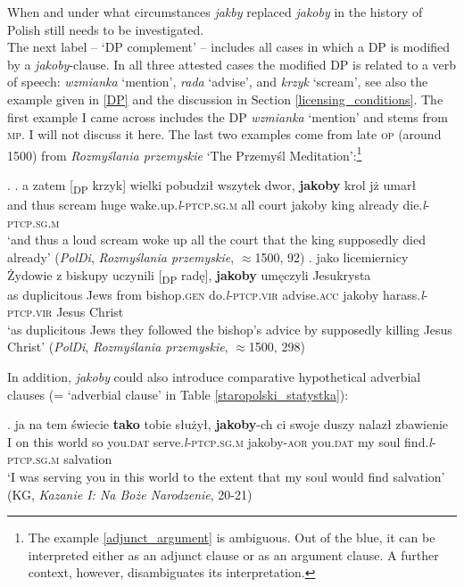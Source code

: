 \documentclass[output=paper
,modfonts
,nonflat]{langsci/langscibook}
\newcommand{\glossformat}[1]{\textsc{#1}}
\newcommand{\acc}{\glossformat{acc}\xspace}
\newcommand{\aor}{\glossformat{aor}\xspace}
\newcommand{\dat}{\glossformat{dat}\xspace}
\newcommand{\gen}{\glossformat{gen}\xspace}
\newcommand{\lptcp}{\emph{l}\glossformat{-ptcp}\xspace}
\newcommand{\masc}{\glossformat{m}\xspace}
\newcommand{\sg}{\glossformat{sg}\xspace}
\newcommand{\vir}{\glossformat{vir}\xspace}
\newcommand{\nquelle}[1]{\newline\phantom{x}\hfill(#1)}
\begin{document}
When and under what circumstances \emph{jakby} replaced \emph{jakoby} in the history of Polish still needs to be investigated. \\ The next label – `DP complement' – includes all cases in which a DP is modified by a \emph{jakoby}-clause. In all three attested cases the modified DP is related to a verb of speech: \emph{wzmianka} `mention', \emph{rada} `advise', and \emph{krzyk} `scream', see also the example given in \ref{DP} and the discussion in Section \ref{licensing_conditions}. The first example I came across includes the DP \emph{wzmianka} `mention' and stems from \textsc{mp}. I will not discuss it here. The last two examples come from late \textsc{op} (around 1500) from \emph{Rozmyślania przemyskie} `The Przemyśl Meditation':\footnote{The example \ref{adjunct_argument} is ambiguous. Out of the blue, it can be interpreted either as an adjunct clause or as an argument clause. A further context, however, disambiguates its interpretation.
}          

\ex.	\ag.	a zatem [\textsubscript{DP} krzyk] wielki pobudził wszytek dwor, \textbf{jakoby} krol jż umarł \label{adjunct_argument} \\
		and thus {} scream huge wake.up.{\lptcp}.{\sg}.{\masc} all court jakoby king already die.{\lptcp}.{\sg}.{\masc} \\
		`and thus a loud scream woke up all the court that  the king supposedly died already' \nquelle{\emph{PolDi}, \emph{Rozmyślania przemyskie}, $\approx$1500, 92} 
	\bg.	jako licemiernicy Żydowie z biskupy uczynili \hspace{1,0cm} [\textsubscript{DP} radę], \textbf{jakoby} umęczyli Jesukrysta \\
		as duplicitous Jews from bishop.{\gen} do.{\lptcp}.{\vir} {} {} advise.{\acc} jakoby harass.{\lptcp}.{\vir} {Jesus Christ} \\   
		 `as duplicitous Jews they followed the bishop's advice by supposedly killing Jesus Christ'  \nquelle{\emph{PolDi}, \emph{Rozmyślania przemyskie}, $\approx$1500, 298}

In addition, \emph{jakoby} could also introduce comparative hypothetical adverbial clauses (= `adverbial clause' in Table \ref{staropolski_statystka}):

\exg.		ja na tem świecie \textbf{tako} tobie służył, \textbf{jakoby}-ch ci swoje duszy nalazł zbawienie \label{adjunct-jakoby} \\
		I on this world so you.{\dat} serve.{\lptcp}.{\sg}.{\masc} jakoby-{\aor} you.{\dat} my soul find.{\lptcp}.{\sg}.{\masc} salvation \\
		`I was serving you in this world to the extent that my soul would find salvation' \nquelle{KG, \emph{Kazanie I: Na Boże Narodzenie}, 20-21} 
\end{document}

